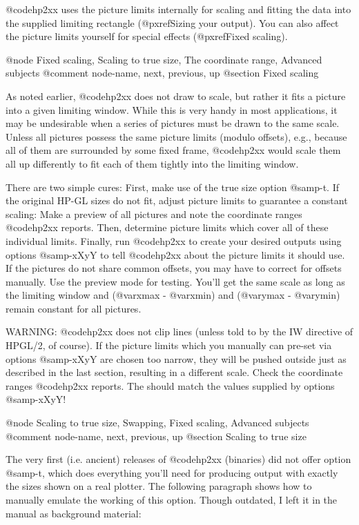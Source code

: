 @code{hp2xx} uses the picture limits internally for scaling and fitting the
data into the supplied  limiting rectangle (@pxref{Sizing your output}).
You can also affect the picture limits yourself for special effects
(@pxref{Fixed scaling}).



@node Fixed scaling, Scaling to true size, The coordinate range, Advanced subjects
@comment  node-name,  next,  previous,  up
@section Fixed scaling

As noted earlier, @code{hp2xx} does not draw to scale, but rather it fits
a picture into a given limiting window. While this is very handy in most
applications, it may be undesirable when a series of pictures must be drawn
to the same scale. Unless all pictures possess the same picture limits
(modulo offsets), e.g., because all of them are surrounded by some fixed
frame, @code{hp2xx} would scale them all up differently to fit each of them
tightly into the limiting window.

There are two simple cures: First, make use of the true size option @samp{-t}.
If the original HP-GL sizes do not fit, adjust picture limits to
guarantee a constant scaling: Make a preview of all pictures and note
the coordinate ranges @code{hp2xx} reports. Then, determine picture limits
which cover all of these individual limits. Finally, run @code{hp2xx}
to create your desired outputs using options @samp{-xXyY} to tell
@code{hp2xx} about the picture limits it should use. If the pictures
do not share common offsets, you may have to correct for offsets
manually. Use the preview mode for testing. You'll get the same scale
as long as the limiting window and (@var{xmax} - @var{xmin}) and
(@var{ymax} - @var{ymin}) remain constant for all pictures.

WARNING: @code{hp2xx} does not clip lines (unless told to by the IW
directive of HPGL/2, of course). If the picture limits which
you manually can pre-set via options @samp{-xXyY} are chosen too narrow,
they will be pushed outside just as described in the last section,
resulting in a different scale. Check the coordinate ranges @code{hp2xx}
reports. The should match the values supplied by options @samp{-xXyY}!




@node Scaling to true size, Swapping, Fixed scaling, Advanced subjects
@comment  node-name,  next,  previous,  up
@section Scaling to true size

The very first (i.e. ancient) releases of @code{hp2xx} (binaries) did not offer option
@samp{-t}, which does everything you'll need for producing output with
exactly the sizes shown on a real plotter. The following paragraph
shows how to manually emulate the working of this option. Though outdated,
I left it in the manual as background material:

